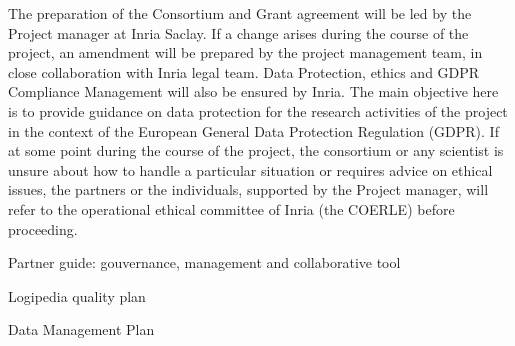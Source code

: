 \begin{workpackage}[id=management,type=MGT,wphases=1-48,
  short=Management,
  title=Management,
  lead=Inr,InrRM=34,InnRM=2,SacRM=2,TumRM=2,LieRM=2,BelRM=2,DelRM=2,FauRM=2]
\begin{tasklist}
  \begin{task}[id=legal,title={Legal Management (data, ethics, GDPR)},shorttitle={Legal},
      lead=Inr,InrRM=4,wphases=1-48]
    The preparation of the Consortium and Grant agreement will be led
    by the Project manager at Inria Saclay. If a change
    arises during the course of the project, an amendment will be
    prepared by the project management team, in close collaboration
    with Inria legal team.  Data Protection, ethics and GDPR
    Compliance Management will also be ensured by Inria. The main
    objective here is to provide guidance on data protection for the
    research activities of the project in the context of the European
    General Data Protection Regulation (GDPR). If at some point during
    the course of the project, the consortium or any scientist is
    unsure about how to handle a particular situation or requires
    advice on ethical issues, the partners or the individuals,
    supported by the Project manager, will refer to the operational ethical
    committee of Inria (the COERLE) before proceeding.
  \end{task}
\end{tasklist}

\begin{wpdelivs}

\begin{wpdeliv}[due=3,id=guide,dissem=PU,nature=R,lead=Inr,task=coordination]{
Partner guide: gouvernance, management and collaborative tool}
\end{wpdeliv}

\begin{wpdeliv}[due=3,id=collab-tools,dissem=PU,nature=R,lead=Inr, task=coordination]{Logipedia quality plan}\end{wpdeliv}



\begin{wpdeliv}[due=4,id=data-plan,dissem=PU,nature=R,lead=Inr, task=coordination]{Data Management Plan}\end{wpdeliv}

\end{wpdelivs}





\end{workpackage}


